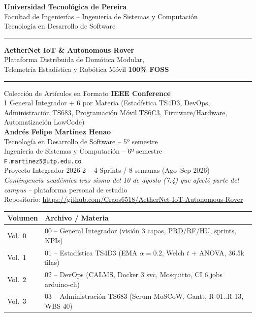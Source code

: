 \documentclass[a4paper,12pt]{article}
\begin{document}
\thispagestyle{empty}
\begin{center}
{\large \textbf{Universidad Tecnológica de Pereira}}\\[2mm]
{\small Facultad de Ingenierías -- Ingeniería de Sistemas y Computación}\\
{\small Tecnología en Desarrollo de Software}\\[6mm]
\hrule\vspace{6mm}
{\LARGE \textbf{AetherNet IoT \& Autonomous Rover}}\\[4mm]
{\Large Plataforma Distribuida de Domótica Modular,\\Telemetría Estadística y Robótica Móvil \textbf{100\% FOSS}}\\[6mm]
\hrule\vspace{6mm}
{\large Colección de Artículos en Formato \textbf{IEEE Conference}}\\[2mm]
{\small 1 General Integrador + 6 por Materia (Estadística TS4D3, DevOps, Administración TS683, Programación Móvil TS6C3, Firmware/Hardware, Automatización LowCode)}\\[8mm]
{\large \textbf{Andrés Felipe Martínez Henao}}\\
{\small Tecnología en Desarrollo de Software -- 5º semestre}\\
{\small Ingeniería de Sistemas y Computación -- 6º semestre}\\
{\small \texttt{F.martinez5@utp.edu.co}}\\[6mm]
{\small Proyecto Integrador 2026-2 -- 4 Sprints / 8 semanas (Ago--Sep 2026)}\\
{\small \textit{Contingencia académica tras sismo del 10 de agosto (7.4) que afectó parte del campus} -- plataforma personal de estudio}\\[4mm]
{\small Repositorio: \url{https://github.com/Craos6518/AetherNet-IoT-Autonomous-Rover}}\\[10mm]
\begin{tabular}{@{}ll@{}}
\toprule
\textbf{Volumen} & \textbf{Archivo / Materia}\\
\midrule
Vol.~0 & 00 -- General Integrador (visión 3 capas, PRD/RF/HU, sprints, KPIs)\\
Vol.~1 & 01 -- Estadística TS4D3 (EMA $\alpha=0.2$, Welch $t$ + ANOVA, 36.5k filas)\\
Vol.~2 & 02 -- DevOps (CALMS, Docker 3 svc, Mosquitto, CI 6 jobs arduino-cli)\\
Vol.~3 & 03 -- Administración TS683 (Scrum MoSCoW, Gantt, R-01..R-13, WBS 40)\\

\end{tabular}
\end{center}
\end{document}
